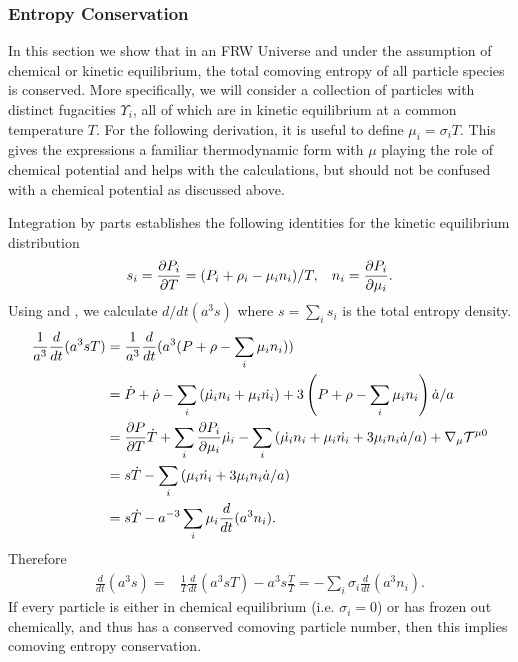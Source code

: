 \subsubsection{Entropy Conservation}
In this section we show that in an FRW Universe and under the assumption of chemical or kinetic equilibrium, the total comoving entropy of all particle species is conserved. More specifically, we will consider a collection of particles with distinct fugacities $\Upsilon_i$, all of which are in kinetic equilibrium at a common temperature $T$.   For the following derivation, it is useful to define $\mu_i=\sigma_i T$.  This gives the expressions a familiar thermodynamic form with $\mu$ playing the role of chemical potential and helps with the calculations, but should not be confused with a chemical potential as discussed above.  

Integration by parts establishes the following identities for the kinetic equilibrium distribution 
\begin{equation}\label{identities}
s_i=\frac{\partial P_i}{\partial T}=(P_i+\rho_i-\mu_i n_i)/T, \hspace{3mm} n_i=\frac{\partial P_i}{\partial \mu_i}.
\end{equation}
 Using  and , we calculate $d/dt(a^3s)$ where $s=\sum_i s_i$ is the total entropy density.
\begin{align}\frac{1}{a^3}\frac{d}{dt}(a^3sT)&=\frac{1}{a^{3}}\frac{d}{dt}(a^3(P+\rho-\sum_i \mu_i n_i))\\
&=\dot{P}+\dot{\rho}-\sum_i \left(\dot{\mu_i}n_i+\mu_i\dot{n_i}\right)+3\left(P+\rho-\sum_i \mu_i n_i\right)\dot{a}/a\notag\\
&=\frac{\partial P}{\partial T} \dot{T}+\sum_i\frac{\partial P_i}{\partial \mu_i} \dot{\mu_i}-\sum_i \left(\dot{\mu_i}n_i+\mu_i\dot{n_i}+3\mu_i n_i \dot{a}/a\right)+\nabla_\mu \mathcal{T}^{\mu 0}\notag\\
&=s\dot{T}-\sum_i \left(\mu_i\dot{n_i}+3\mu_i n_i \dot{a}/a\right)\notag\\
&=s\dot{T}- a^{-3}\sum_i\mu_i\frac{d}{dt}(a^3n_i).
\end{align}
Therefore
\begin{align}\label{S_n_eq}
\frac{d}{dt}(a^3s)=&\frac{1}{T}\frac{d}{dt}(a^3sT)-a^3s\frac{\dot T}{T}=-\sum_i\sigma_i\frac{d}{dt}(a^3n_i).
\end{align}
If every particle is either in chemical equilibrium (i.e. $\sigma_i= 0$) or has frozen out chemically, and thus has a conserved comoving particle number, then this implies comoving entropy conservation.  

